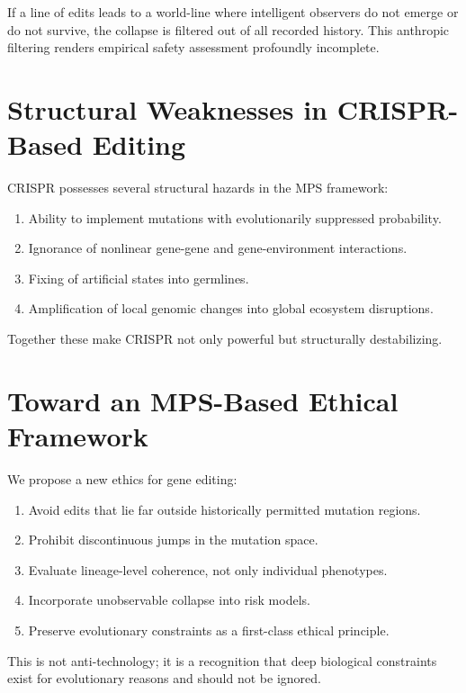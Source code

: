 \documentclass[11pt]{article}
\begin{document}
If a line of edits leads to a world-line where intelligent observers do not emerge or do not survive, the collapse is filtered out of all recorded history. This anthropic filtering renders empirical safety assessment profoundly incomplete.

\section{Structural Weaknesses in CRISPR-Based Editing}

CRISPR possesses several structural hazards in the MPS framework:

\begin{enumerate}
    \item Ability to implement mutations with evolutionarily suppressed probability.
    \item Ignorance of nonlinear gene-gene and gene-environment interactions.
    \item Fixing of artificial states into germlines.
    \item Amplification of local genomic changes into global ecosystem disruptions.
\end{enumerate}

Together these make CRISPR not only powerful but structurally destabilizing.

\section{Toward an MPS-Based Ethical Framework}

We propose a new ethics for gene editing:

\begin{enumerate}
    \item Avoid edits that lie far outside historically permitted mutation regions.
    \item Prohibit discontinuous jumps in the mutation space.
    \item Evaluate lineage-level coherence, not only individual phenotypes.
    \item Incorporate unobservable collapse into risk models.
    \item Preserve evolutionary constraints as a first-class ethical principle.
\end{enumerate}

This is not anti-technology; it is a recognition that deep biological constraints exist for evolutionary reasons and should not be ignored.
\end{document}
